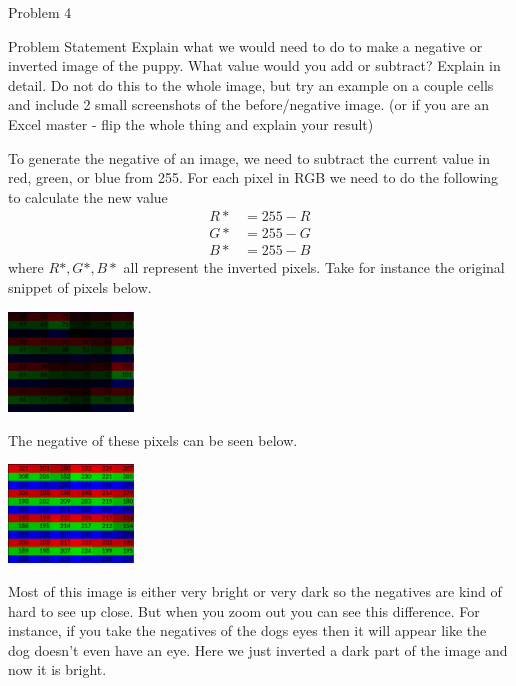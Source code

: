 \begin{problem}{Problem 4}
    \begin{statement}{Problem Statement}
        Explain what we would need to do to make a negative or inverted image of the puppy. What value would you add or subtract? Explain in detail. Do not do this to the whole image, but try an example 
        on a couple cells and include 2  small screenshots of the before/negative image. (or if you are an Excel master - flip the whole thing and explain your result)
    \end{statement}

    \begin{Highlight}[Solution]
        To generate the negative of an image, we need to subtract the current value in red, green, or blue from 255. For each pixel in RGB we need to do the following to calculate the new value
        \begin{align*}
            R* & = 255 - R \\
            G* & = 255 - G \\
            B* & = 255 - B 
        \end{align*}
        where $R*,G*,B*$ all represent the inverted pixels. Take for instance the original snippet of pixels below.

        \begin{center}
            \includegraphics[width=0.25\textwidth]{Images/Original.png}
        \end{center}
        The negative of these pixels can be seen below.

        \begin{center}
            \includegraphics[width=0.25\textwidth]{Images/New.png}
        \end{center}
        Most of this image is either very bright or very dark so the negatives are kind of hard to see up close. But when you zoom out you can see this difference. For instance, if you take the negatives
        of the dogs eyes then it will appear like the dog doesn't even have an eye. Here we just inverted a dark part of the image and now it is bright.
    \end{Highlight}
\end{problem}

